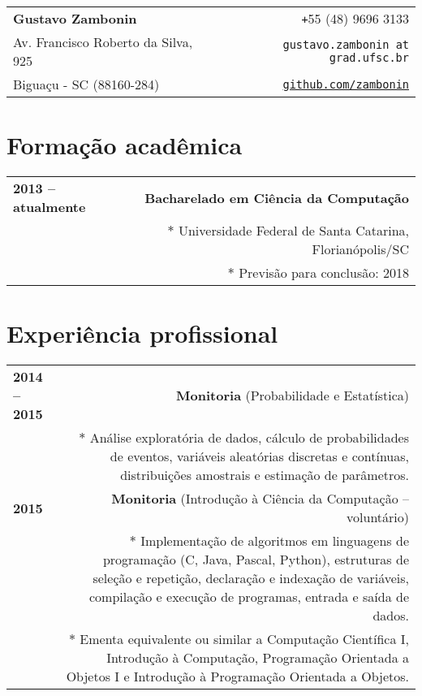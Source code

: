 \documentclass[11pt]{article}
\newcommand \grayrule{\color{lightgray} \vrule}
\newcommand \last{\leftskip0.5cm $\ast$ }
\begin{document}
\hspace{-0.9cm}
\begin{tabular*}{20.1cm}{l@{\extracolsep{\fill}}r}

\textbf{\Large Gustavo Zambonin}
& \texttt{+}55 (48) 9696 3133 \\
Av. Francisco Roberto da Silva, 925
& \texttt{gustavo.zambonin at grad.ufsc.br} \\
Biguaçu - SC (88160-284)
& \texttt{\href{http://github.com/zambonin}{github.com/zambonin}}
\end{tabular*}

\section*{Formação acadêmica}
\begin{tabular}{>{\bf}L!{\grayrule}R}

     2013 --
  atualmente & \textbf{Bacharelado em Ciência da Computação} \\
             & \last Universidade Federal de Santa Catarina,
             Florianópolis/SC \\
             & \last Previsão para conclusão: 2018 \\
\end{tabular}

\section*{Experiência profissional}
\begin{tabular}{>{\bf}L!{\grayrule}R}

2014 -- 2015 & \textbf{Monitoria} (Probabilidade e Estatística) \\
             & \last Análise exploratória de dados, cálculo de probabilidades
             de eventos, variáveis aleatórias discretas e contínuas,
             distribuições amostrais e estimação de parâmetros.
             \\ [10pt]

        2015 & \textbf{Monitoria} (Introdução à Ciência da Computação --
             voluntário) \\
             & \last Implementação de algoritmos em linguagens
             de programação (C, Java, Pascal, Python), estruturas de seleção e
             repetição, declaração e indexação de variáveis, compilação e
             execução de programas, entrada e saída de dados. \\
             & \last Ementa equivalente ou similar a Computação
             Científica I, Introdução à Computação, Programação Orientada a
             Objetos I e Introdução à Programação Orientada a Objetos.
\end{tabular}
\end{document}
